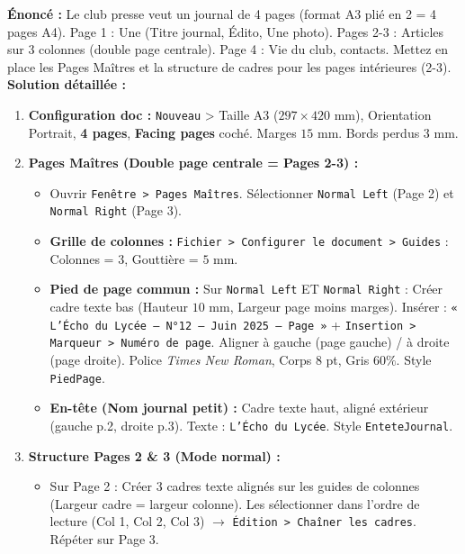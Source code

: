 \documentclass[11pt]{article}
\begin{document}
\begin{exoresolu}
    \textbf{Énoncé :} Le club presse veut un journal de 4 pages (format A3 plié en 2 = 4 pages A4). Page 1 : Une (Titre journal, Édito, Une photo). Pages 2-3 : Articles sur 3 colonnes (double page centrale). Page 4 : Vie du club, contacts. Mettez en place les Pages Maîtres et la structure de cadres pour les pages intérieures (2-3).
    \tcblower
    \textbf{Solution détaillée :}
    \begin{enumerate}
        \item \textbf{Configuration doc :} \texttt{Nouveau} > Taille A3 ($297 \times 420$ mm), Orientation Portrait, \textbf{4 pages}, \textbf{Facing pages} coché. Marges $15$ mm. Bords perdus $3$ mm.
        \item \textbf{Pages Maîtres (Double page centrale = Pages 2-3) :}
              \begin{itemize}
                  \item Ouvrir \texttt{Fenêtre > Pages Maîtres}. Sélectionner \texttt{Normal Left} (Page 2) et \texttt{Normal Right} (Page 3).
                  \item \textbf{Grille de colonnes :} \texttt{Fichier > Configurer le document > Guides} : Colonnes = $3$, Gouttière = $5$ mm.
                  \item \textbf{Pied de page commun :} Sur \texttt{Normal Left} ET \texttt{Normal Right} : Créer cadre texte bas (Hauteur $10$ mm, Largeur page moins marges). Insérer : \texttt{« L'Écho du Lycée — N°12 — Juin 2025 — Page »} + \texttt{Insertion > Marqueur > Numéro de page}. Aligner à gauche (page gauche) / à droite (page droite). Police \textit{Times New Roman}, Corps $8$ pt, Gris $60\%$. Style \texttt{PiedPage}.
                  \item \textbf{En-tête (Nom journal petit) :} Cadre texte haut, aligné extérieur (gauche p.2, droite p.3). Texte : \texttt{L'Écho du Lycée}. Style \texttt{EnteteJournal}.
              \end{itemize}
        \item \textbf{Structure Pages 2 \& 3 (Mode normal) :}
              \begin{itemize}
                  \item Sur Page 2 : Créer $3$ cadres texte alignés sur les guides de colonnes (Largeur cadre = largeur colonne). Les sélectionner dans l'ordre de lecture (Col 1, Col 2, Col 3) $\rightarrow$ \texttt{Édition > Chaîner les cadres}. Répéter sur Page 3.

\end{itemize}
\end{enumerate}
\end{exoresolu}
\end{document}

